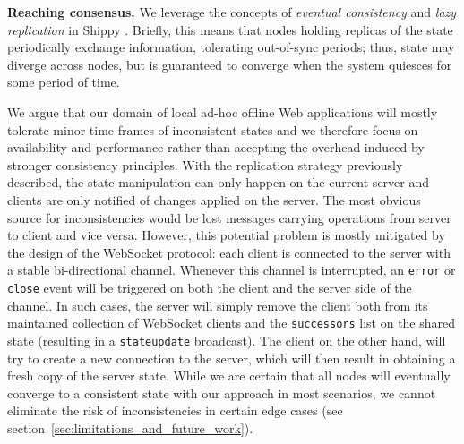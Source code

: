 \textbf{Reaching consensus.}
We leverage the concepts of \textit{eventual consistency} and \textit{lazy replication} in Shippy \cite{Ladin:1990,Ladin:1992}.
Briefly, this means that nodes holding replicas of the state periodically exchange information, tolerating out-of-sync periods; thus, state may diverge across nodes, but is guaranteed to converge when the system quiesces for some period of time.

We argue that our domain of local ad-hoc offline Web applications will mostly tolerate minor time frames of inconsistent states and we therefore focus on availability and performance rather than accepting the overhead induced by stronger consistency principles.
With the replication strategy previously described, the state manipulation can only happen on the current server and clients are only notified of changes applied on the server.
The most obvious source for inconsistencies would be lost messages carrying operations from server to client and vice versa.
However, this potential problem is mostly mitigated by the design of the WebSocket protocol: each client is connected to the server with a stable bi-directional channel. 
Whenever this channel is interrupted, an \texttt{error} or \texttt{close} event will be triggered on both the client and the server side of the channel.
In such cases, the server will simply remove the client both from its maintained collection of WebSocket clients and the \texttt{successors} list on the shared state (resulting in a \texttt{stateupdate} broadcast). 
The client on the other hand, will try to create a new connection to the server, which will then result in obtaining a fresh copy of the server state.
While we are certain that all nodes will eventually converge to a consistent state with our approach in most scenarios, we cannot eliminate the risk of inconsistencies in certain edge cases (see section~\ref{sec:limitations_and_future_work}).